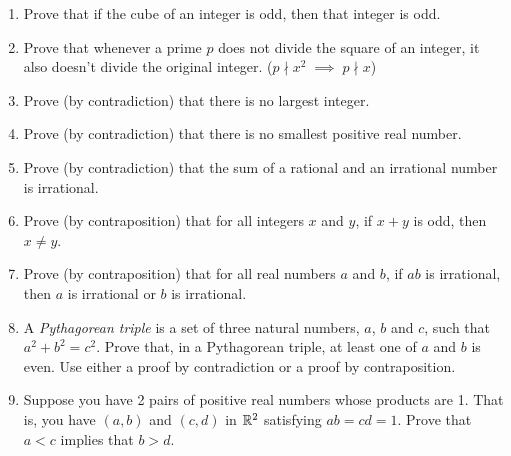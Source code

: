 \begin{enumerate}
\item Prove that if the cube of an integer is odd, then that integer is odd.

\item Prove that whenever a prime $p$ does not divide the square of an integer, 
it also doesn't divide the original integer. 
($p \nmid x^2 \; \implies \; p \nmid x$)

\item Prove (by contradiction) that there is no largest integer.

\item Prove (by contradiction) that there is no smallest positive real number.

\item Prove (by contradiction) that the sum of a rational and an irrational 
number is irrational.

\item Prove (by contraposition) that for all integers $x$ and $y$, if $x+y$ is odd, then $x\neq y$.

\item Prove (by contraposition) that for all real numbers $a$ and $b$, if $ab$ is irrational, then $a$
is irrational or $b$ is irrational.

\item A \emph{Pythagorean triple} is a set of three
natural numbers, $a$, $b$ and $c$, such that $a^2 + b^2 = c^2$.  Prove that, in a
Pythagorean triple, at least one of $a$ and $b$ is even.  Use either a proof by
contradiction or a proof by contraposition.

\item Suppose you have 2 pairs of positive real numbers whose products are 1.  That is, you have $(a,b)$ and $(c,d)$ in ${\mathbb R}^2$ satisfying $ab=cd=1$.  Prove that
$a < c$ implies that $b > d$. 
\end{enumerate}
